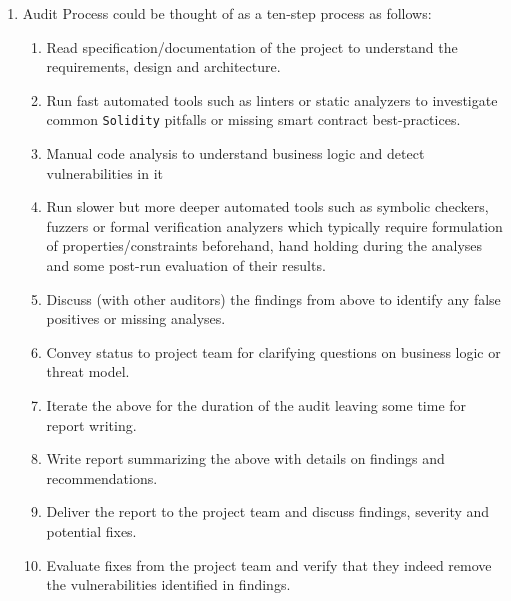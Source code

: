 \begin{enumerate}
\item Audit Process could be thought of as a ten-step process as follows:
	\begin{enumerate}
	\item Read specification/documentation of the project to understand the requirements, design and architecture.
	\item Run fast automated tools such as linters or static analyzers to investigate common \verb|Solidity| pitfalls or missing smart contract best-practices.
	\item Manual code analysis to understand business logic and detect vulnerabilities in it
	\item Run slower but more deeper automated tools such as symbolic checkers, fuzzers or formal verification analyzers which typically require formulation of properties/constraints beforehand, hand holding during the analyses and some post-run evaluation of their results.
	\item Discuss (with other auditors) the findings from above to identify any false positives or missing analyses.
	\item Convey status to project team for clarifying questions on business logic or threat model.
	\item Iterate the above for the duration of the audit leaving some time for report writing.
	\item Write report summarizing the above with details on findings and recommendations.
	\item Deliver the report to the project team and discuss findings, severity and potential fixes.
	\item Evaluate fixes from the project team and verify that they indeed remove the vulnerabilities identified in findings.
	\end{enumerate}


\end{enumerate}

